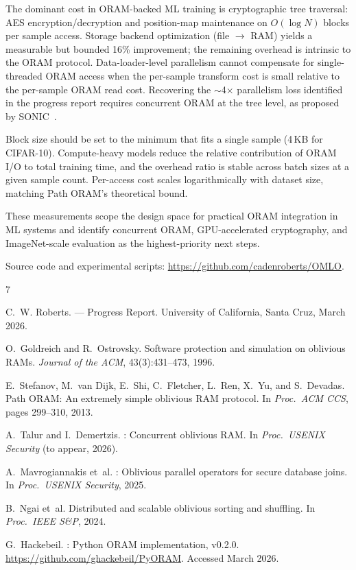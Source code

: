 \documentclass[11pt]{article}
\begin{document}
The dominant cost in ORAM-backed ML training is cryptographic tree traversal: AES encryption/decryption and position-map maintenance on $O(\log N)$ blocks per sample access.
Storage backend optimization (file $\to$ RAM) yields a measurable but bounded 16\% improvement; the remaining overhead is intrinsic to the ORAM protocol.
Data-loader-level parallelism cannot compensate for single-threaded ORAM access when the per-sample transform cost is small relative to the per-sample ORAM read cost.
Recovering the $\sim$4$\times$ parallelism loss identified in the progress report requires concurrent ORAM at the tree level, as proposed by SONIC~\cite{talur2026}.

Block size should be set to the minimum that fits a single sample (4\,KB for CIFAR-10).
Compute-heavy models reduce the relative contribution of ORAM I/O to total training time, and the overhead ratio is stable across batch sizes at a given sample count.
Per-access cost scales logarithmically with dataset size, matching Path ORAM's theoretical bound.

These measurements scope the design space for practical ORAM integration in ML systems and identify concurrent ORAM, GPU-accelerated cryptography, and ImageNet-scale evaluation as the highest-priority next steps.

\smallskip
\noindent Source code and experimental scripts: \url{https://github.com/cadenroberts/OMLO}.

\begin{thebibliography}{7}

C.~W. Roberts.
 --- Progress Report.
\newblock University of California, Santa Cruz, March 2026.

O.~Goldreich and R.~Ostrovsky.
\newblock Software protection and simulation on oblivious {RAM}s.
\newblock \emph{Journal of the ACM}, 43(3):431--473, 1996.

E.~Stefanov, M.~van Dijk, E.~Shi, C.~Fletcher, L.~Ren, X.~Yu, and S.~Devadas.
\newblock Path {ORAM}: An extremely simple oblivious {RAM} protocol.
\newblock In \emph{Proc.\ ACM CCS}, pages 299--310, 2013.

A.~Talur and I.~Demertzis.
: Concurrent oblivious {RAM}.
\newblock In \emph{Proc.\ USENIX Security} (to appear, 2026).

A.~Mavrogiannakis et~al.
: Oblivious parallel operators for secure database joins.
\newblock In \emph{Proc.\ USENIX Security}, 2025.

B.~Ngai et~al.
\newblock Distributed and scalable oblivious sorting and shuffling.
\newblock In \emph{Proc.\ IEEE S\&P}, 2024.

G.~Hackebeil.
: Python {ORAM} implementation, v0.2.0.
\newblock \url{https://github.com/ghackebeil/PyORAM}. Accessed March 2026.

\end{thebibliography}
\end{document}
